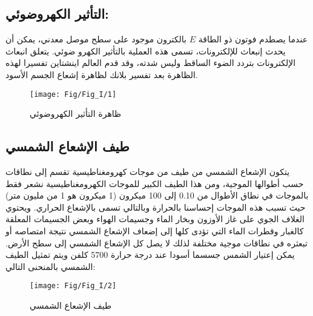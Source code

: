 \subsection{التأثير الكهروضوئي:}
عندما يصطدم فوتون ذو الطاقة $ E $ بالكترون موجود على سطح موصل معدني، يمكن أن يحدث إنبعاث للإلكترونات، تسمى هذه العملية بالتأثير الكهرو ضوئي. يتعلق انبعاث الإلكترونات بتردد الضوء الساقط وليس شدته، وقد قدم العالم اينشتاين تفسيرا لهذه الظاهرة بعد تفسير بلانك لظاهرة إشعاع الجسم الأسود.

\begin{figure}[h!]
	\centering
	\texttt{[image: Fig/Fig\_I/1]}
	\caption{ظاهرة التأثير الكهروضوئي}
	\label{fig:1}
\end{figure}
\FloatBarrier

\subsection{طيف الإشعاع الشمسي}
يتكون الإشعاع الشمسي من طيف من موجات كهرومغناطيسية تقسم إلى نطاقات حسب أطوالها الموجية، ومن هذا الطيف الكبير للموجات الكهرومغناطيسية نشعر فقط بالموجات في نطاق الأطوال من 0.10 إلى 100 ميكرون (1 ميكرون هو 1 من مليون متر) حيث تسبب هذه الموجات إحساسنا بالحرارة وبالتالي تسمى بالإشعاع الحراري. ويحتوي الغلاف الجوي على غاز الأوزون وبخار الماء وجسيمات الهواء وبعض الجسيمات المعلقة كالغبار وقطرات الماء التي تؤدى كلها إلى إضعاف الإشعاع الشمسي نتيجة امتصاصه أو تبعثره في نطاقات موجية مختلفة لذلك لا يصل كل الإشعاع الشمسي إلى سطح الأرض. يمكن إعتيار الشمس جسسما أسودا عند درجة حرارة 5700 كلفن ويتم تمثيل الطيف الشمسي بالمنحنى التالي:
\begin{figure}[h!]
	\centering
	\texttt{[image: Fig/Fig\_I/2]}
	\caption{طيف الإشعاع الشمسي}
	\label{fig:2}
\end{figure}
\FloatBarrier
